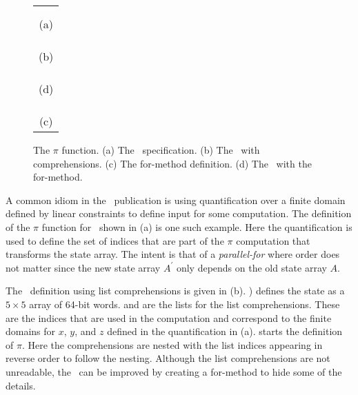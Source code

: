 \begin{figure}[t]
  \begin{center}
    \begin{tabular}{l}
      \usebox{\fipsPi} \\ \\
      \multicolumn{1}{c}{(a)} \\ \\
      \usebox{\PiCry} \\ \\
      \multicolumn{1}{c}{(b)} \\ \\
      \usebox{\formethod} \\ \\
      \multicolumn{1}{c}{(d)} \\ \\ 
      \usebox{\PiCryLib} \\ \\
      \multicolumn{1}{c}{(c)}
    \end{tabular}
  \end{center}
  \caption{The $\pi$ function. (a) The \fips\ specification. (b) The \cryptol\ with comprehensions. (c) The for-method definition. (d) The \cryptol\ with the for-method.}
  \label{fig:pi}
\end{figure}

A common idiom in the \fips\ publication is using quantification over a finite domain defined by linear constraints to define input for some computation.
The definition of the $\pi$ function for \keccak\ shown in (a) is one such example.
Here the quantification is used to define the set of indices that are part of the $\pi$ computation that transforms the state array. The intent is that of a \emph{parallel-for} where order does not matter since the new state array $A^\prime$ only depends on the old state array $A$.

The \cryptol\ definition using list comprehensions is given in (b).
) defines the state as a $5 \times 5$ array of 64-bit words.
 and  are the lists for the list comprehensions.
These are the indices that are used in the computation and correspond to the finite domains for $x$, $y$, and $z$ defined in the quantification in (a).
 starts the definition of $\pi$. 
Here the comprehensions are nested with the list indices appearing in reverse order to follow the nesting.
Although the list comprehensions are not unreadable, the \cryptol\ can be improved by creating a for-method to hide some of the details.

